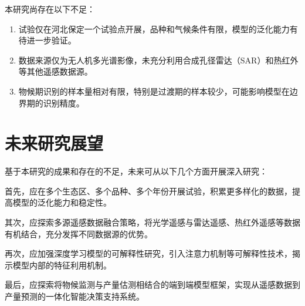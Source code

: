 本研究尚存在以下不足：

\begin{enumerate}[itemsep=0pt,parsep=0pt]
  \item 试验仅在河北保定一个试验点开展，品种和气候条件有限，模型的泛化能力有待进一步验证。
  \item 数据来源仅为无人机多光谱影像，未充分利用合成孔径雷达（SAR）和热红外等其他遥感数据源。
  \item 物候期识别的样本量相对有限，特别是过渡期的样本较少，可能影响模型在边界期的识别精度。
\end{enumerate}

\section{未来研究展望}
\label{sec:future}

基于本研究的成果和存在的不足，未来可从以下几个方面开展深入研究：

首先，应在多个生态区、多个品种、多个年份开展试验，积累更多样化的数据，提高模型的泛化能力和稳定性。

其次，应探索多源遥感数据融合策略，将光学遥感与雷达遥感、热红外遥感等数据有机结合，充分发挥不同数据源的优势。

再次，应加强深度学习模型的可解释性研究，引入注意力机制等可解释性技术，揭示模型内部的特征利用机制。

最后，应探索将物候监测与产量估测相结合的端到端模型框架，实现从遥感数据到产量预测的一体化智能决策支持系统。
